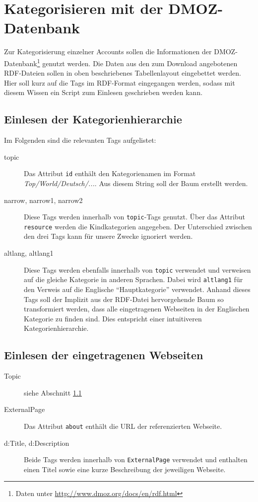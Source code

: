 \section{Kategorisieren mit der DMOZ-Datenbank}
Zur Kategorisierung einzelner Accounts sollen die Informationen der DMOZ-Datenbank\footnote{Daten unter \url{http://www.dmoz.org/docs/en/rdf.html}} genutzt werden. Die Daten aus den zum Download angebotenen RDF-Dateien sollen in oben beschriebenes Tabellenlayout eingebettet werden. Hier soll kurz auf die Tags im RDF-Format eingegangen werden, sodass mit diesem Wissen ein Script zum Einlesen geschrieben werden kann.

\subsection{Einlesen der Kategorienhierarchie}\label{sec:katHierarchie}
Im Folgenden sind die relevanten Tags aufgelistet:
\begin{description}
	\item[topic] Das Attribut \lstinline{id} enthält den Kategorienamen im Format \emph{Top/World/Deutsch/...}. Aus diesem String soll der Baum erstellt werden.
	\item[narrow, narrow1, narrow2] Diese Tags werden innerhalb von \lstinline{topic}-Tags genutzt. Über das Attribut \lstinline{resource} werden die Kindkategorien angegeben. Der Unterschied zwischen den drei Tags kann für unsere Zwecke ignoriert werden.
	\item[altlang, altlang1] Diese Tags werden ebenfalls innerhalb von \lstinline{topic} verwendet und verweisen auf die gleiche Kategorie in anderen Sprachen. Dabei wird \lstinline{altlang1} für den Verweis auf die Englische "`Hauptkategorie"' verwendet. Anhand dieses Tags soll der Implizit aus der RDF-Datei hervorgehende Baum so transformiert werden, dass alle eingetragenen Webseiten in der Englischen Kategorie zu finden sind. Dies entspricht einer intuitiveren Kategorienhierarchie.
\end{description}

\subsection{Einlesen der eingetragenen Webseiten}
\begin{description}
	\item[Topic] siehe Abschnitt \ref{sec:katHierarchie}
	\item[ExternalPage] Das Attribut \lstinline{about} enthält die URL der referenzierten Webseite.
	\item[d:Title, d:Description] Beide Tags werden innerhalb von \lstinline{ExternalPage} verwendet und enthalten einen Titel sowie eine kurze Beschreibung der jeweiligen Webseite.
\end{description}